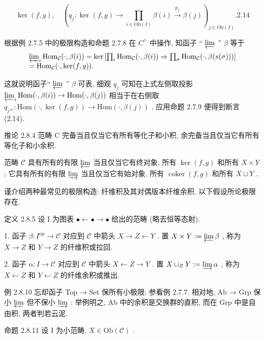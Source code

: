 \documentclass[]{article}
\begin{document}
$$
\ker (f, g), \quad \left(q _ {j}: \ker (f, g) \rightarrow \prod_ {i \in \mathrm{Ob} (I)} \beta (i) \xrightarrow {p _ {j}} \beta (j)\right) _ {j \in \mathrm{Ob} (I)}.  {2.14}
$$

根据例 2.7.5 中的极限构造和命题 2.7.8 在 $C^{\wedge}$ 中操作, 知函子 “ $\varprojlim$ ” $\beta$ 等于 $$
\begin{array}{l} \varprojlim_ {i} \operatorname{Hom} _ {\mathcal {C}} (\cdot , \beta (i)) = \ker \left[ \prod_ {i} \operatorname{Hom} _ {\mathcal {C}} (\cdot , \beta (i)) \Rightarrow \prod_ {\sigma} \operatorname{Hom} _ {\mathcal {C}} (\cdot , \beta (s (\sigma))) \right] \\ = \operatorname{Hom} _ {\mathcal {C}} (\cdot , \ker (f, g)). \\ \end{array}
$$

这就说明函子“ $\varprojlim$ ” $\beta$ 可表, 细观 $q_j$ 可知在上式左侧取投影 $\varprojlim_i \mathrm{Hom}(\cdot, \beta(i)) \to \mathrm{Hom}(\cdot, \beta(j))$ 相当于在右侧取 $q_{j*}: \mathrm{Hom}(\cdot, \ker(f, g)) \to \mathrm{Hom}(\cdot, \beta(j))$ . 应用命题 2.7.9 便得到断言 (2.14). 

推论 2.8.4 范畴 C 完备当且仅当它有所有等化子和小积, 余完备当且仅当它有所有等化子和小余积. 

范畴 $\mathcal{C}$ 具有所有的有限 $\varprojlim$ 当且仅当它有终对象, 所有 $\ker (f,g)$ 和所有 $X\times Y$ ; 它具有所有的有限 $\varinjlim$ 当且仅当它有始对象, 所有 $\operatorname {coker}(f,g)$ 和所有 $X\sqcup Y$ . 

谨介绍两种最常见的极限构造: 纤维积及其对偶版本纤维余积. 以下假设所论极限存在. 

定义 2.8.5 设 I 为图表 $\bullet \leftarrow \bullet \rightarrow \bullet$ 给出的范畴 (略去恒等态射). 

1. 函子 $\beta: I^{\mathrm{op}} \to \mathcal{C}$ 对应到 $\mathcal{C}$ 中箭头 $X \to Z \leftarrow Y$ . 置 $X \times Y := \varprojlim \beta$ , 称为 $X \to Z$ 和 $Y \to Z$ 的纤维积或拉回. 

2. 函子 $\alpha: I \to \mathcal{C}$ 对应到 $\mathcal{C}$ 中箭头 $X \leftarrow Z \rightarrow Y$ . 置 $X \sqcup_{Z} Y := \varinjlim \alpha$ , 称为 $X \leftarrow Z$ 和 $Y \leftarrow Z$ 的纤维余积或推出. 

例 2.8.10 忘却函子 Top → Set 保所有小极限: 参看例 2.7.7. 相对地, Ab → Grp 保小 $\varprojlim$ 但不保小 $\varinjlim$ : 举例明之, Ab 中的余积是交换群的直积, 而在 Grp 中是自由积, 两者判若云泥. 

命题 2.8.11 设 I 为小范畴, $X \in \mathrm{Ob}(\mathcal{C})$ . 
\end{document}
